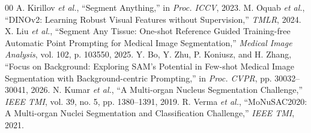 \documentclass[10pt,twocolumn]{article}
\begin{document}
\newpage
\begin{thebibliography}{00}
 A. Kirillov \emph{et al.}, ``Segment Anything,'' in \emph{Proc. ICCV}, 2023.
 M. Oquab \emph{et al.}, ``DINOv2: Learning Robust Visual Features without Supervision,'' \emph{TMLR}, 2024.
 X. Liu \emph{et al.}, ``Segment Any Tissue: One-shot Reference Guided Training-free Automatic Point Prompting for Medical Image Segmentation,'' \emph{Medical Image Analysis}, vol. 102, p. 103550, 2025.
 Y. Bo, Y. Zhu, P. Koniusz, and H. Zhang, ``Focus on Background: Exploring SAM's Potential in Few-shot Medical Image Segmentation with Background-centric Prompting,'' in \emph{Proc. CVPR}, pp. 30032--30041, 2026.
 N. Kumar \emph{et al.}, ``A Multi-organ Nucleus Segmentation Challenge,'' \emph{IEEE TMI}, vol. 39, no. 5, pp. 1380--1391, 2019.
 R. Verma \emph{et al.}, ``MoNuSAC2020: A Multi-organ Nuclei Segmentation and Classification Challenge,'' \emph{IEEE TMI}, 2021.
\end{thebibliography}
\end{document}
